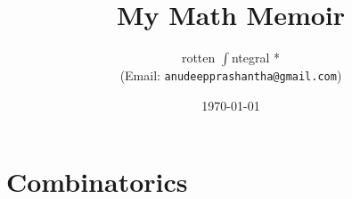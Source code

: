 \documentclass[a4paper, 11pt]{book}
\title{\textbf{My Math Memoir}}
\author{rotten $\int$ntegral *\\(Email: \texttt{anudeepprashantha@gmail.com})}
\date{\today}
\begin{document}
\maketitle
    \tableofcontents
	\chapter{Combinatorics}
	
\end{document}
